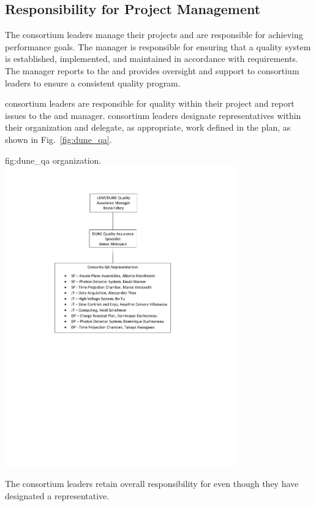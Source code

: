 \subsection{Responsibility for Project Management}

The  consortium leaders manage their projects and are
responsible for achieving performance goals. The
  manager is responsible for
ensuring that a quality system is established, implemented, and
maintained in accordance with requirements. The
  manager reports to the
  and provides oversight and support to
consortium leaders to ensure a consistent quality program.

 consortium leaders are responsible for quality within
their project and report  issues to the 
 and  
manager.  consortium leaders designate 
representatives within their organization and delegate, as appropriate, 
work defined in the   plan, as
shown in Fig.~\ref{fig:dune_qa}.
\begin{dunefigure}{fig:dune_qa}
  {  organization.}
  \includegraphics[width=0.75\textwidth]{graphics/dune_qa3}
\end{dunefigure}
The  consortium leaders retain overall responsibility for
 even though they have designated a 
representative.

